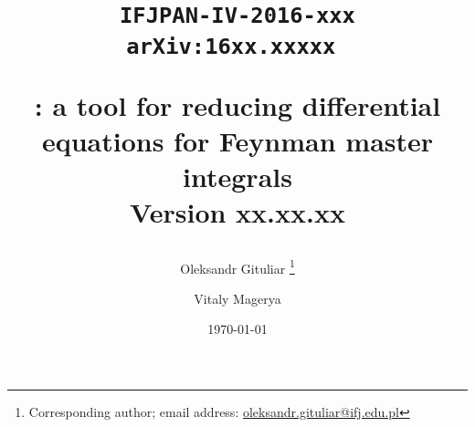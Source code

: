 \title{
  \begin{flushright}
  \tt\normalsize{IFJPAN-IV-2016-xxx}\\ 
  \tt\normalsize{arXiv:16xx.xxxxx} 
  \end{flushright}
  \vspace{1cm}
  \Large \bf \fuchsia: a tool for reducing differential equations for Feynman master integrals\\
  \vspace{0.5cm}
  \normalsize \bf Version xx.xx.xx
}

\author[a]{Oleksandr Gituliar%
    \thanks{Corresponding author; email address:
        \href{mailto:oleksandr.gituliar@ifj.edu.pl}
            {oleksandr.gituliar@ifj.edu.pl}}}

\author[ ]{Vitaly Magerya}


\date{\today}
